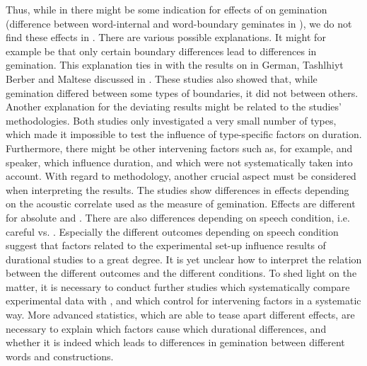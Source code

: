 Thus, while in \cite{Oh.2012} there might be some indication for effects of  on gemination (difference between word-internal and word-boundary geminates in ), we do not find these effects in \cite{Oh.2013}. There are various possible explanations. 
It might for example be that only certain boundary differences lead to differences in gemination. This explanation ties in with the results on  in German, Tashlhiyt Berber and Maltese discussed in . These studies also showed that, while gemination differed between some types of boundaries, it did not between others. 
Another explanation for the deviating results might be related to the studies' methodologies.  
Both studies only investigated a very small number of types, which made it impossible to test the influence of type-specific factors on duration. Furthermore, there might be other intervening factors such as, for example,  and speaker, which influence duration, and which were not systematically  taken into account. 
With regard to methodology, another crucial aspect must be considered when interpreting the results.
The studies show differences in effects depending on the acoustic correlate used as the measure of gemination. Effects are different for absolute and . There are also differences depending on speech condition, i.e. careful vs. . 
Especially the different outcomes depending on speech condition suggest that factors related to the experimental set-up influence results of durational studies to a great degree. It is yet unclear how to interpret the relation between the different outcomes and the different conditions.
To shed light on the matter, it is necessary to conduct further studies which systematically compare experimental data with , and which control for intervening factors in a systematic way. More advanced statistics, which are able to tease apart different effects, are necessary to explain which factors cause which durational differences, and whether it is indeed  which leads to differences in gemination between different words and constructions.




